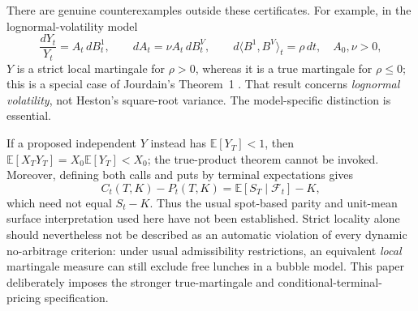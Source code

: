 \documentclass[11pt,a4paper]{article}
\numberwithin{equation}{section}
\theoremstyle{definition}\newtheorem{definition}[theorem]{Definition}
\theoremstyle{remark}\newtheorem{remark}[theorem]{Remark}
\newcommand{\E}{\mathbb E}\newcommand{\R}{\mathbb R}
\newcommand{\F}{\mathcal F}\newcommand{\G}{\mathcal G}
\begin{document}
There are genuine counterexamples outside these certificates. For example, in the lognormal-volatility model
\[
 \frac{dY_t}{Y_t}=A_t\,dB_t^1,\qquad
 dA_t=\nu A_t\,dB_t^V,\qquad
 d\langle B^1,B^V\rangle_t=\rho\,dt,
 \quad A_0,\nu>0,
\]
$Y$ is a strict local martingale for $\rho>0$, whereas it is a true martingale for $\rho\leq0$; this is a special case of Jourdain's Theorem~1 \cite{Jourdain2004}. That result concerns \emph{lognormal volatility}, not Heston's square-root variance. The model-specific distinction is essential.

If a proposed independent $Y$ instead has $\E[Y_T]<1$, then $\E[X_TY_T]=X_0\E[Y_T]<X_0$; the true-product theorem cannot be invoked. Moreover, defining both calls and puts by terminal expectations gives
\[
 C_t(T,K)-P_t(T,K)=\E[S_T\mid\F_t]-K,
\]
which need not equal $S_t-K$. Thus the usual spot-based parity and unit-mean surface interpretation used here have not been established. Strict locality alone should nevertheless not be described as an automatic violation of every dynamic no-arbitrage criterion: under usual admissibility restrictions, an equivalent \emph{local} martingale measure can still exclude free lunches in a bubble model. This paper deliberately imposes the stronger true-martingale and conditional-terminal-pricing specification.
\end{document}
